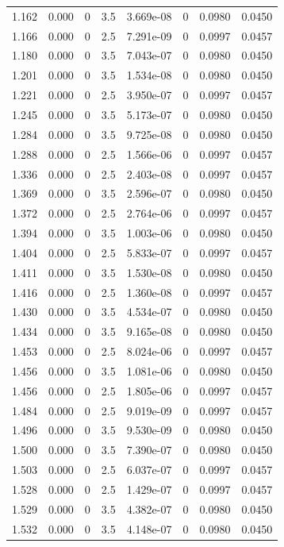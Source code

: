 \documentclass[preview]{standalone}
\begin{document}
{{{\begin{tabular}{L{1.2cm}C{1.2cm} C{0.3cm}C{0.5cm} C{1.4cm}C{1.4cm} C{1.4cm}C{1.4cm}}
  1.162  &  0.000  & 0     & 3.5 &  3.669e-08  & 0  & 0.0980 &  0.0450   \\ 
  1.166  &  0.000  & 0     & 2.5 &  7.291e-09  & 0  & 0.0997 &  0.0457   \\ 
  1.180  &  0.000  & 0     & 3.5 &  7.043e-07  & 0  & 0.0980 &  0.0450   \\ 
  1.201  &  0.000  & 0     & 3.5 &  1.534e-08  & 0  & 0.0980 &  0.0450   \\ 
  1.221  &  0.000  & 0     & 2.5 &  3.950e-07  & 0  & 0.0997 &  0.0457   \\ 
  1.245  &  0.000  & 0     & 3.5 &  5.173e-07  & 0  & 0.0980 &  0.0450   \\ 
  1.284  &  0.000  & 0     & 3.5 &  9.725e-08  & 0  & 0.0980 &  0.0450   \\ 
  1.288  &  0.000  & 0     & 2.5 &  1.566e-06  & 0  & 0.0997 &  0.0457   \\ 
  1.336  &  0.000  & 0     & 2.5 &  2.403e-08  & 0  & 0.0997 &  0.0457   \\ 
  1.369  &  0.000  & 0     & 3.5 &  2.596e-07  & 0  & 0.0980 &  0.0450   \\ 
  1.372  &  0.000  & 0     & 2.5 &  2.764e-06  & 0  & 0.0997 &  0.0457   \\ 
  1.394  &  0.000  & 0     & 3.5 &  1.003e-06  & 0  & 0.0980 &  0.0450   \\ 
  1.404  &  0.000  & 0     & 2.5 &  5.833e-07  & 0  & 0.0997 &  0.0457   \\ 
  1.411  &  0.000  & 0     & 3.5 &  1.530e-08  & 0  & 0.0980 &  0.0450   \\ 
  1.416  &  0.000  & 0     & 2.5 &  1.360e-08  & 0  & 0.0997 &  0.0457   \\ 
  1.430  &  0.000  & 0     & 3.5 &  4.534e-07  & 0  & 0.0980 &  0.0450   \\ 
  1.434  &  0.000  & 0     & 3.5 &  9.165e-08  & 0  & 0.0980 &  0.0450   \\ 
  1.453  &  0.000  & 0     & 2.5 &  8.024e-06  & 0  & 0.0997 &  0.0457   \\ 
  1.456  &  0.000  & 0     & 3.5 &  1.081e-06  & 0  & 0.0980 &  0.0450   \\ 
  1.456  &  0.000  & 0     & 2.5 &  1.805e-06  & 0  & 0.0997 &  0.0457   \\ 
  1.484  &  0.000  & 0     & 2.5 &  9.019e-09  & 0  & 0.0997 &  0.0457   \\ 
  1.496  &  0.000  & 0     & 3.5 &  9.530e-09  & 0  & 0.0980 &  0.0450   \\ 
  1.500  &  0.000  & 0     & 3.5 &  7.390e-07  & 0  & 0.0980 &  0.0450   \\ 
  1.503  &  0.000  & 0     & 2.5 &  6.037e-07  & 0  & 0.0997 &  0.0457   \\ 
  1.528  &  0.000  & 0     & 2.5 &  1.429e-07  & 0  & 0.0997 &  0.0457   \\ 
  1.529  &  0.000  & 0     & 3.5 &  4.382e-07  & 0  & 0.0980 &  0.0450   \\ 
  1.532  &  0.000  & 0     & 3.5 &  4.148e-07  & 0  & 0.0980 &  0.0450   \\ 
\hline 
\end{tabular} 

}}}
\end{document}
